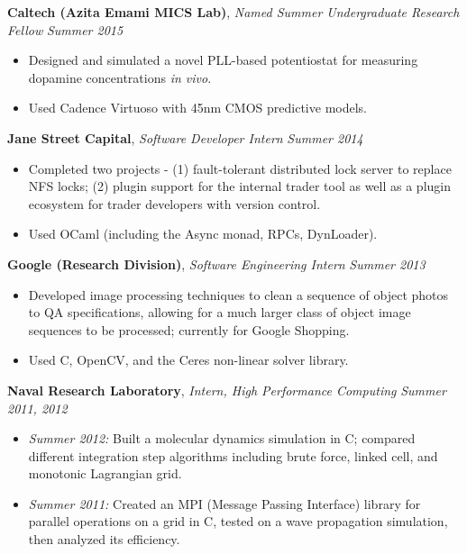 \documentclass{article}
\newenvironment{changemargin}[2]{%
  \begin{list}{}{%
    \setlength{\topsep}{0pt}%
    \setlength{\leftmargin}{#1}%
    \setlength{\rightmargin}{#2}%
    \setlength{\listparindent}{\parindent}%
    \setlength{\itemindent}{\parindent}%
    \setlength{\parsep}{\parskip}%
  }%
  \item[]}{\end{list}
}
\newenvironment{body} {
	\vspace*{-16pt}
	\begin{changemargin}{-0.25in}{-0.5in}
  }	
	{\end{changemargin}
}
\newcommand{\CC}{C\nolinebreak\hspace{-.05em}\raisebox{.4ex}{\tiny\bf +}\nolinebreak\hspace{-.10em}\raisebox{.4ex}{\tiny\bf +}}
\begin{document}
\begin{body}
	\vspace{14pt}
	
	\textbf{Caltech (Azita Emami MICS Lab)}, \emph{Named Summer Undergraduate Research Fellow} \hfill \emph{Summer 2015}\\
	\vspace*{-4pt}
	\begin{itemize}
		\item Designed and simulated a novel PLL-based potentiostat for measuring dopamine concentrations \emph{in vivo}.
		\item Used Cadence Virtuoso with 45nm CMOS predictive models. %
	\end{itemize}

	\smallskip

	\textbf{Jane Street Capital}, \emph{Software Developer Intern} \hfill \emph{Summer 2014}\\
	\vspace*{-4pt}
	\begin{itemize}
		\item Completed two projects - (1) fault-tolerant distributed lock server to replace NFS locks; (2) plugin support for the internal trader tool as well as a plugin ecosystem for trader developers with version control.
		\item Used OCaml (including the Async monad, RPCs, DynLoader).
	\end{itemize}

	\smallskip

	\textbf{Google (Research Division)}, \emph{Software Engineering Intern} \hfill \emph{Summer 2013}\\
	\vspace*{-4pt}
	\begin{itemize}
		\item Developed image processing techniques to clean a sequence of object photos to QA specifications, allowing for a much larger class of object image sequences to be processed; currently for Google Shopping.
		\item Used \CC, OpenCV, and the Ceres non-linear solver library.
	\end{itemize}

	\smallskip

	\textbf{Naval Research Laboratory}, \emph{Intern, High Performance Computing} \hfill \emph{Summer 2011, 2012}\\
	\vspace*{-4pt}
	\begin{itemize}
		\item \emph{Summer 2012:} Built a molecular dynamics simulation in C; compared different integration step algorithms including brute force, linked cell, and monotonic Lagrangian grid.
		\item \emph{Summer 2011:} Created an MPI (Message Passing Interface) library for parallel operations on a grid in \CC, tested on a wave propagation simulation, then analyzed its efficiency.
	\end{itemize}


\end{body}
\end{document}
